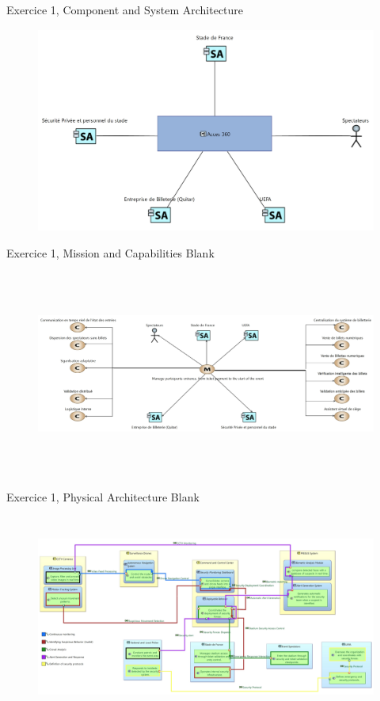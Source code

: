 \documentclass[aspectratio=1610]{beamer}
\begin{document}
    \begin{frame}{Exercice 1, Component and System Architecture}
        \begin{figure}[H]
            \centering
            \includegraphics[width=\textwidth, height=6.75cm, keepaspectratio]{./images/EX1/CSC_5RO08_TA_EX1_CSA.jpg}
        \end{figure}
    \end{frame}
    \begin{frame}{Exercice 1, Mission and Capabilities Blank}
        \begin{figure}[H]
            \centering
            \includegraphics[width=\textwidth, height=6.75cm, keepaspectratio]{./images/EX1/CSC_5RO08_TA_EX1_MCB.jpg}
        \end{figure}
    \end{frame}
    \begin{frame}{Exercice 1, Physical Architecture Blank}
        \begin{figure}[H]
            \centering
            \includegraphics[width=\textwidth, height=6.75cm, keepaspectratio]{./images/EX1/CSC_5RO08_TA_EX1_PAB.jpg}
        \end{figure}
    \end{frame}
\end{document}
